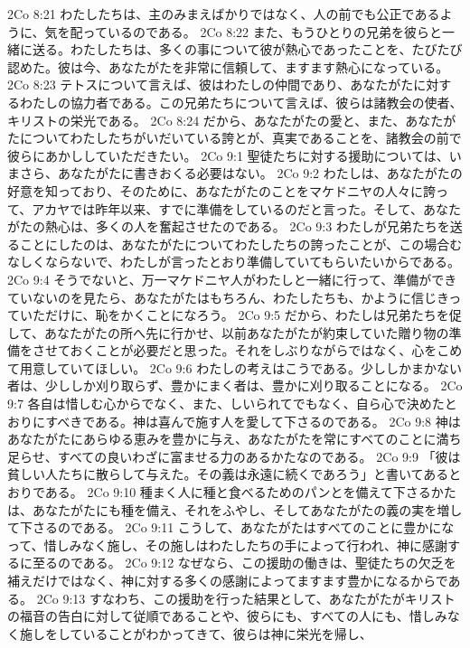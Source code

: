 2Co 8:21  わたしたちは、主のみまえばかりではなく、人の前でも公正であるように、気を配っているのである。
2Co 8:22  また、もうひとりの兄弟を彼らと一緒に送る。わたしたちは、多くの事について彼が熱心であったことを、たびたび認めた。彼は今、あなたがたを非常に信頼して、ますます熱心になっている。
2Co 8:23  テトスについて言えば、彼はわたしの仲間であり、あなたがたに対するわたしの協力者である。この兄弟たちについて言えば、彼らは諸教会の使者、キリストの栄光である。
2Co 8:24  だから、あなたがたの愛と、また、あなたがたについてわたしたちがいだいている誇とが、真実であることを、諸教会の前で彼らにあかししていただきたい。
2Co 9:1  聖徒たちに対する援助については、いまさら、あなたがたに書きおくる必要はない。
2Co 9:2  わたしは、あなたがたの好意を知っており、そのために、あなたがたのことをマケドニヤの人々に誇って、アカヤでは昨年以来、すでに準備をしているのだと言った。そして、あなたがたの熱心は、多くの人を奮起させたのである。
2Co 9:3  わたしが兄弟たちを送ることにしたのは、あなたがたについてわたしたちの誇ったことが、この場合むなしくならないで、わたしが言ったとおり準備していてもらいたいからである。
2Co 9:4  そうでないと、万一マケドニヤ人がわたしと一緒に行って、準備ができていないのを見たら、あなたがたはもちろん、わたしたちも、かように信じきっていただけに、恥をかくことになろう。
2Co 9:5  だから、わたしは兄弟たちを促して、あなたがたの所へ先に行かせ、以前あなたがたが約束していた贈り物の準備をさせておくことが必要だと思った。それをしぶりながらではなく、心をこめて用意していてほしい。
2Co 9:6  わたしの考えはこうである。少ししかまかない者は、少ししか刈り取らず、豊かにまく者は、豊かに刈り取ることになる。
2Co 9:7  各自は惜しむ心からでなく、また、しいられてでもなく、自ら心で決めたとおりにすべきである。神は喜んで施す人を愛して下さるのである。
2Co 9:8  神はあなたがたにあらゆる恵みを豊かに与え、あなたがたを常にすべてのことに満ち足らせ、すべての良いわざに富ませる力のあるかたなのである。
2Co 9:9  「彼は貧しい人たちに散らして与えた。その義は永遠に続くであろう」と書いてあるとおりである。
2Co 9:10  種まく人に種と食べるためのパンとを備えて下さるかたは、あなたがたにも種を備え、それをふやし、そしてあなたがたの義の実を増して下さるのである。
2Co 9:11  こうして、あなたがたはすべてのことに豊かになって、惜しみなく施し、その施しはわたしたちの手によって行われ、神に感謝するに至るのである。
2Co 9:12  なぜなら、この援助の働きは、聖徒たちの欠乏を補えだけではなく、神に対する多くの感謝によってますます豊かになるからである。
2Co 9:13  すなわち、この援助を行った結果として、あなたがたがキリストの福音の告白に対して従順であることや、彼らにも、すべての人にも、惜しみなく施しをしていることがわかってきて、彼らは神に栄光を帰し、
